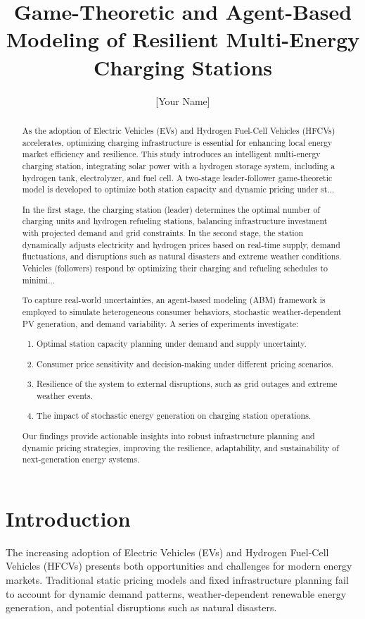 \documentclass{article}
\title{Game-Theoretic and Agent-Based Modeling of Resilient Multi-Energy Charging Stations}
\author{[Your Name]}
\begin{document}
\maketitle

\begin{abstract}
As the adoption of Electric Vehicles (EVs) and Hydrogen Fuel-Cell Vehicles (HFCVs) accelerates, optimizing charging infrastructure is essential for enhancing local energy market efficiency and resilience. This study introduces an intelligent multi-energy charging station, integrating solar power with a hydrogen storage system, including a hydrogen tank, electrolyzer, and fuel cell. A two-stage leader-follower game-theoretic model is developed to optimize both station capacity and dynamic pricing under st...

In the first stage, the charging station (leader) determines the optimal number of charging units and hydrogen refueling stations, balancing infrastructure investment with projected demand and grid constraints. In the second stage, the station dynamically adjusts electricity and hydrogen prices based on real-time supply, demand fluctuations, and disruptions such as natural disasters and extreme weather conditions. Vehicles (followers) respond by optimizing their charging and refueling schedules to minimi...

To capture real-world uncertainties, an agent-based modeling (ABM) framework is employed to simulate heterogeneous consumer behaviors, stochastic weather-dependent PV generation, and demand variability. A series of experiments investigate:
\begin{enumerate}
    \item Optimal station capacity planning under demand and supply uncertainty.
    \item Consumer price sensitivity and decision-making under different pricing scenarios.
    \item Resilience of the system to external disruptions, such as grid outages and extreme weather events.
    \item The impact of stochastic energy generation on charging station operations.
\end{enumerate}

Our findings provide actionable insights into robust infrastructure planning and dynamic pricing strategies, improving the resilience, adaptability, and sustainability of next-generation energy systems.
\end{abstract}

\section{Introduction}
The increasing adoption of Electric Vehicles (EVs) and Hydrogen Fuel-Cell Vehicles (HFCVs) presents both opportunities and challenges for modern energy markets. Traditional static pricing models and fixed infrastructure planning fail to account for dynamic demand patterns, weather-dependent renewable energy generation, and potential disruptions such as natural disasters. 
\end{document}
